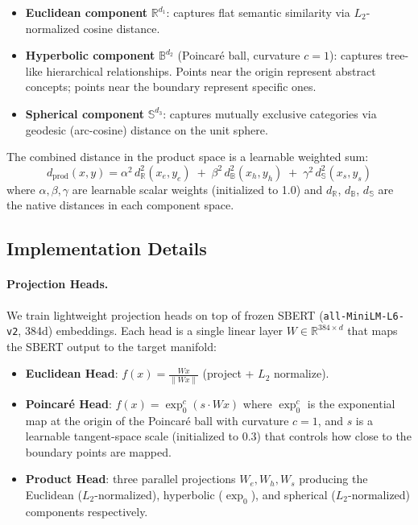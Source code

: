 \documentclass{article}
\begin{document}
\begin{itemize}[nosep,leftmargin=1.5em]
    \item \textbf{Euclidean component} $\mathbb{R}^{d_1}$: captures flat semantic similarity via $L_2$-normalized cosine distance.
    \item \textbf{Hyperbolic component} $\mathbb{B}^{d_2}$ (Poincar\'e ball, curvature $c{=}1$): captures tree-like hierarchical relationships. Points near the origin represent abstract concepts; points near the boundary represent specific ones.
    \item \textbf{Spherical component} $\mathbb{S}^{d_3}$: captures mutually exclusive categories via geodesic (arc-cosine) distance on the unit sphere.
\end{itemize}

The combined distance in the product space is a learnable weighted sum:
\begin{equation}
d_{\text{prod}}(x,y) = \alpha^2 \, d_{\mathbb{R}}^2(x_e,y_e) \;+\; \beta^2 \, d_{\mathbb{B}}^2(x_h,y_h) \;+\; \gamma^2 \, d_{\mathbb{S}}^2(x_s,y_s)
\label{eq:product_distance}
\end{equation}
where $\alpha, \beta, \gamma$ are learnable scalar weights (initialized to 1.0) and $d_{\mathbb{R}}$, $d_{\mathbb{B}}$, $d_{\mathbb{S}}$ are the native distances in each component space.

\subsection{Implementation Details}

\paragraph{Projection Heads.} We train lightweight projection heads on top of frozen SBERT (\texttt{all-MiniLM-L6-v2}, 384d) embeddings. Each head is a single linear layer $W \in \mathbb{R}^{384 \times d}$ that maps the SBERT output to the target manifold:

\begin{itemize}[nosep,leftmargin=1.5em]
    \item \textbf{Euclidean Head}: $f(x) = \frac{Wx}{\|Wx\|}$ (project + $L_2$ normalize).
    \item \textbf{Poincar\'e Head}: $f(x) = \exp_0^c(s \cdot Wx)$ where $\exp_0^c$ is the exponential map at the origin of the Poincar\'e ball with curvature $c{=}1$, and $s$ is a learnable tangent-space scale (initialized to 0.3) that controls how close to the boundary points are mapped.
    \item \textbf{Product Head}: three parallel projections $W_e, W_h, W_s$ producing the Euclidean ($L_2$-normalized), hyperbolic ($\exp_0$), and spherical ($L_2$-normalized) components respectively.
\end{itemize}
\end{document}

